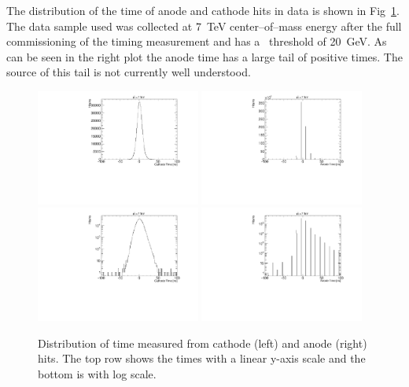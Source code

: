 The distribution of the time of anode and cathode hits in data is shown in Fig~\ref{fig:hittime}.
The data sample used was collected at 7~TeV center--of--mass energy after the full commissioning of the timing measurement and has a \pt\ threshold of 20~GeV.
As can be seen in the right plot the anode time has a large tail of positive times. The source of this tail is not currently well understood.

\begin{figure}
  \begin{center}
      \includegraphics[clip=true, trim=0.0cm 0cm 0.0cm 0cm, width=0.48\textwidth]{figures/timing/CathodeTime}
      \includegraphics[clip=true, trim=0.0cm 0cm 0.0cm 0cm, width=0.48\textwidth]{figures/timing/AnodeTime} \\
      \includegraphics[clip=true, trim=0.0cm 0cm 0.0cm 0cm, width=0.48\textwidth]{figures/timing/CathodeTimeLog}
      \includegraphics[clip=true, trim=0.0cm 0cm 0.0cm 0cm, width=0.48\textwidth]{figures/timing/AnodeTimeLog} \\
      \caption[Distribution of time of anode and cathode hits]
      {Distribution of time measured from cathode (left) and anode (right) hits.
The top row shows the times with a linear y-axis scale and the bottom is with log scale.
	}
      \label{fig:hittime}
  \end{center}
\end{figure}

